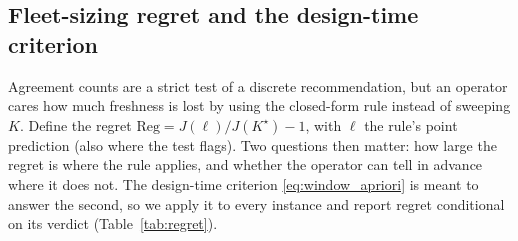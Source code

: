 \documentclass[journal,outdir=./]{IEEEtran}
\begin{document}
\subsection{Fleet-sizing regret and the design-time criterion}\label{sec:eval:regret}
Agreement counts are a strict test of a discrete recommendation, but an operator cares how much freshness is lost by using the closed-form rule instead of sweeping $K$. Define the regret $\mathrm{Reg}=J(\ell)/J(K^{\star})-1$, with $\ell$ the rule's point prediction (also where the test flags). Two questions then matter: how large the regret is where the rule applies, and whether the operator can tell in advance where it does not. The design-time criterion \eqref{eq:window_apriori} is meant to answer the second, so we apply it to every instance and report regret conditional on its verdict (Table~\ref{tab:regret}).

\begin{table}[t]\centering
\footnotesize\setlength{\tabcolsep}{3pt}
\caption{Fleet-sizing regret $J(\ell)/J(K^{\star})-1$, conditional on the design-time criterion \eqref{eq:window_apriori}. The 90th percentile is the smallest observed regret with at least 90\% of instances at or below it. Commute-bound instances (ring) are classified by the boundary \eqref{eq:boundary}, to which the window test does not apply.}
\label{tab:regret}
\end{table}
\end{document}
